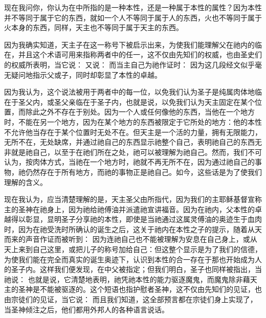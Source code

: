 现在我问你，你认为在中所指的是一种本性，还是一种属于本性的属性？因为本性并不等同于属于它的东西，就如一个人不等同于属于人的东西，火也不等同于属于火本身的东西，同样，天主也不等同于属于天主的东西。\par

因为我确实知道，天主子在这一称号下被启示出来，为使我们能理解父在祂内的临在，并且这个术语可用来指称两者中的任一，这不仅由先知们的权威，也由圣史们的权威所表明，当它说： 又说： 而当主自己为祂作证时： 因为这几段经文似乎毫无疑问地指示父或子，同时却彰显了本性的卓越。\par

因为我认为，这个说法被用于两者中的每一位，以免我们认为圣子是纯属肉体地临在于圣父内，或圣父亲临在于圣子内，也就是说，以免我们认为天主固定在某个位置，而除此之外不存在于别处。因为一个人或任何像他的东西，当他在一个地方时，不能在另一个地方，因为在某个地方的东西被限定于它所处的地方：他的本性不允许他当存在于某个位置时无处不在。但天主是一个活的力量，拥有无限能力，无所不在，无处缺席，并通过祂自己的东西显示祂整个自己，表明祂自己的东西无非就是祂自己，以至于在祂们所在之处，祂可以被理解为祂自己。然而，我们不可认为，按肉体方式，当祂在一个地方时，祂就不再无所不在，因为通过祂自己的事物，祂仍然存在于所有地方，而祂的事物正是祂自己。如今，这些话是为了使我们理解的含义。\par

现在我认为，应当清楚理解的是，天主圣父由所指代，因为我们的主耶稣基督宣称主的圣神在祂身上，因为祂给祂傅油并派遣祂宣讲福音。因为在祂内，父本性的卓越得以彰显，显明圣子分享祂的本性，即使是当祂通过这属灵傅油的奥迹生于血肉时，因为在祂受洗时所确认的诞生之后，这关于祂内在本性之子的提示，随着从天而来的声音作证而被听到： 因为连祂自己也不能被理解为安息在自己身上，或从天上来到自己这里，或把儿子的称号加给自己：但这整个显示是为了我们的信德，为使我们能在完全而真实的诞生奥迹下，认识到本性的合一存在于那也开始成为人的圣子内。这样我们便发现，在中父被指定；但我们明白，圣子也同样被指出，当祂说： 也就是说，它清楚地表明，祂凭祂本性的能力驱逐魔鬼，而魔鬼除非藉天主的圣神是不能被驱逐的。这个短语也指护慰者圣神，这不仅由先知们的见证，也由宗徒们的见证，当它说： 而且我们知道，这全部预言都在宗徒们身上实现了，当圣神倾注之后，他们都用外邦人的各种语言说话。\par

